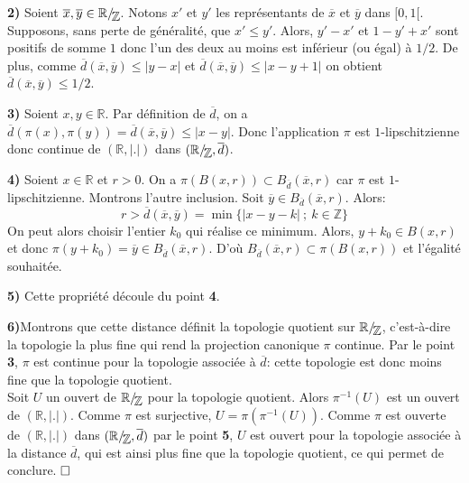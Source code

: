 \documentclass[11pt,a4 paper]{article}
\newcommand{\Rbb}{\mathbb{R}}
\newcommand{\Zbb}{\mathbb{Z}}
\newcommand*{\EnsembleQuotient}[2]%
{\ensuremath{%
		#1/\!\raisebox{-.65ex}{\ensuremath{\mathcal{#2}}}}}
\begin{document}
	\par \textbf{2)} Soient $\overline{x}, \overline{y} \in \EnsembleQuotient{\Rbb}{\Zbb}$. Notons $x'$ et $y'$ les représentants de $\overline{x}$ et $\overline{y}$ dans $[0,1[$. Supposons, sans perte de généralité, que $x'\leq y'$. Alors, $y'-x'$ et $1-y'+x'$ sont positifs de somme $1$ donc l'un des deux au moins est inférieur (ou égal) à $1/2$. De plus, comme $\overline{d}(\overline{x},\overline{y})\leq|y-x| $ et $\overline{d}(\overline{x},\overline{y})\leq|x-y+1|$ on obtient $\overline{d}(\overline{x},\overline{y})\leq1/2$.\\

	\par\textbf{3)} Soient $x,y \in \Rbb$. Par définition de $\overline{d}$, on a $\overline{d}(\pi(x),\pi(y))=\overline{d}(\overline{x},\overline{y})\leq |x-y|$. Donc l'application $\pi$ est $1$-lipschitzienne donc continue de $(\mathbb{R},|.|)$ dans $(\EnsembleQuotient{\Rbb}{\mathbb{Z}},\overline{d})$. \\
	
	\par\textbf{4)} Soient $x \in \Rbb$ et $r>0$. On a $\pi(B(x,r))\subset B_{\overline{d}}(\overline{x},r)$ car $\pi$ est $1$-lipschitzienne. Montrons l'autre inclusion. Soit $\overline{y} \in B_{\overline{d}}(\overline{x},r)$. Alors:
	$$r>\overline{d}(\overline{x},\overline{y})= \min\lbrace |x-y-k|\ ;\ k \in \Zbb\rbrace$$
	On peut alors choisir l'entier $k_0$ qui réalise ce minimum. Alors, $y+k_0 \in B(x,r)$ et donc $\pi(y+k_0)= \overline{y} \in B_{\overline{d}}(\overline{x},r)$. D'où $B_{\overline{d}}(\overline{x},r) \subset \pi(B(x,r))$ et l'égalité souhaitée.\\
	
	\par \textbf{5)} Cette propriété découle du point \textbf{4}.\\
	
	
	\par\textbf{6)}Montrons que cette distance définit la topologie quotient sur $\EnsembleQuotient{\Rbb}{\Zbb}$, c'est-à-dire la topologie la plus fine qui rend la projection canonique $\pi$ continue. Par le point \textbf{3}, $\pi$ est continue pour la topologie associée à $\overline{d}$: cette topologie est donc moins fine que la topologie quotient.\\
	
	Soit $U$ un ouvert de $\EnsembleQuotient{\Rbb}{\Zbb}$ pour la topologie quotient. Alors $\pi^{-1}(U)$ est un ouvert de $(\Rbb, |.|)$. Comme $\pi$ est surjective, $U=\pi (\pi^{-1}(U))$. Comme $\pi$ est ouverte de $(\Rbb,|.|)$ dans $(\EnsembleQuotient{\Rbb}{\Zbb},\overline{d})$ par le point \textbf{5}, $U$ est ouvert pour la topologie associée à la distance $\overline{d}$, qui est ainsi plus fine que la topologie quotient, ce qui permet de conclure. $\hfill \square$\\
\end{document}
